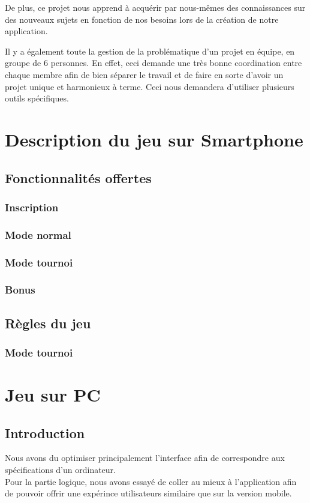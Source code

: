 \documentclass[a4paper,12pt]{article}
\begin{document}
	De plus, ce projet nous apprend à acquérir par nous-mêmes des connaissances sur des nouveaux sujets en fonction de nos besoins lors de la création de notre application. 
	
	Il y a également toute la gestion de la problématique d'un projet en équipe, en groupe de 6 personnes. En effet, ceci demande une très bonne coordination entre chaque membre afin de bien séparer le travail et de faire en sorte d'avoir un projet unique et harmonieux à terme. Ceci nous demandera d'utiliser plusieurs outils spécifiques.
	
	\section{Description du jeu sur Smartphone}
		\subsection{Fonctionnalités offertes}
			\subsubsection{Inscription}
			
			\subsubsection{Mode normal}
			\subsubsection{Mode tournoi}
			\subsubsection{Bonus}
		
		\subsection{Règles du jeu}
			\subsubsection{Mode tournoi}
	
	\section{Jeu sur PC}
	\subsection{Introduction}
	Nous avons du optimiser principalement l'interface afin de correspondre aux spécifications d'un ordinateur.\\
	Pour la partie logique, nous avons essayé de coller au mieux à l'application afin de pouvoir offrir une expérince utilisateurs similaire que sur la version mobile. 
	
\end{document}
